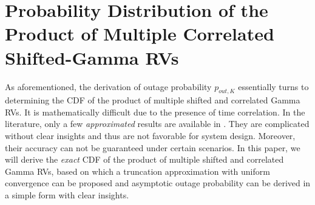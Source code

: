 \documentclass[12pt,onecolumn,draftcls]{IEEEtran}
\begin{document}
\section{Probability Distribution of the Product of Multiple Correlated Shifted-Gamma RVs}\label{sec:exa}
As aforementioned, the derivation of outage probability ${p_{out,K}}$ essentially turns to determining the CDF of the product of multiple shifted and correlated Gamma RVs. It is mathematically difficult due to the presence of time correlation. In the literature, only a few \emph{approximated} results are available in \cite{yang2014performance,shi2015analysis,shi2016inverse}. They are complicated without clear insights and thus are not favorable for system design. Moreover, their accuracy can not be guaranteed under certain scenarios. In this paper, we will derive the \emph{exact} CDF of the product of multiple shifted and correlated Gamma RVs, based on which a truncation approximation with uniform convergence can be proposed and asymptotic outage probability can be derived in a simple form with clear insights.
\end{document}
